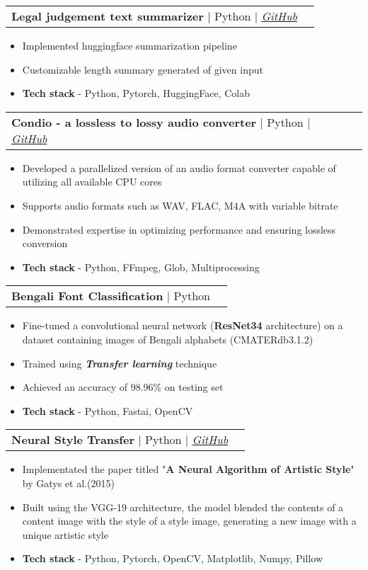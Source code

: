 \documentclass[letterpaper,11pt]{article}
\makeatletter
\newcommand{\resumeItem}[1]{
  \item\small{
    {#1 \vspace{-2pt}}
  }
}
\newcommand{\resumeProjectHeading}[2]{
    \item
    \begin{tabular*}{0.97\textwidth}{l@{\extracolsep{\fill}}r}
      \small#1 & #2 \\
    \end{tabular*}\vspace{-7pt}
}
\newcommand{\resumeItemListStart}{\begin{itemize}}
\newcommand{\resumeItemListEnd}{\end{itemize}\vspace{-5pt}}
\makeatother
\begin{document}
      \resumeProjectHeading
        {\textbf{Legal judgement text summarizer} $|$ Python $|$ \emph{\href{https://github.com/anubhavagr/vidhaan/tree/master/ai_models/judgement_summary}{\color{blue}GitHub}}}{}
          \resumeItemListStart
	  \resumeItem{Implemented huggingface summarization pipeline}
	    \resumeItem{Customizable length summary generated of given input}
            \resumeItem{\textbf{Tech stack} - Python, Pytorch, HuggingFace, Colab\\}
          \resumeItemListEnd
	
	
	\resumeProjectHeading
	{\textbf{Condio - a lossless to lossy audio converter} $|$ Python $|$ \emph{\href{https://github.com/anubhavagr/Condio}{\color{blue}GitHub}}}{}
          \resumeItemListStart
            \resumeItem{Developed a parallelized version of an audio format converter capable of utilizing all available CPU cores}
            \resumeItem{Supports audio formats such as WAV, FLAC, M4A with variable bitrate}
	    \resumeItem{Demonstrated expertise in optimizing performance and ensuring lossless conversion}
	    \resumeItem{\textbf{Tech stack} - Python, FFmpeg, Glob, Multiprocessing\\}
          \resumeItemListEnd

	\resumeProjectHeading
        {\textbf{Bengali Font Classification} $|$ Python}{}
          \resumeItemListStart
	    \resumeItem{Fine-tuned a convolutional neural network (\textbf{ResNet34} architecture) on a dataset containing images of Bengali alphabets (CMATERdb3.1.2)}
	    \resumeItem{Trained using \textbf{\emph{Transfer learning}} technique}
            \resumeItem{Achieved an accuracy of 98.96\% on testing set}
            \resumeItem{\textbf{Tech stack} - Python, Fastai, OpenCV\\}
          \resumeItemListEnd


      
      \resumeProjectHeading
        {\textbf{Neural Style Transfer} $|$ Python $|$ \emph{\href{https://github.com/anubhavagr/neural-style-transfer}{\color{blue}GitHub}}}{}
          \resumeItemListStart
	    \resumeItem{Implementated the paper titled "\textbf{A Neural Algorithm of Artistic Style}" by Gatys et al.(2015)}
	    \resumeItem{Built using the VGG-19 architecture, the model blended the contents of a content image with the style of a style image, generating a new image with a unique artistic style}
	    \resumeItem{\textbf{Tech stack} - Python, Pytorch, OpenCV, Matplotlib, Numpy, Pillow\\}
          \resumeItemListEnd
      
\end{document}

